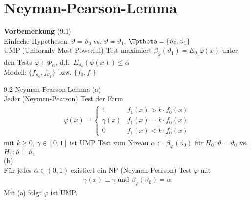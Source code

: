 \documentclass[a4paper,openany]{book}
\theoremstyle{mytheoremstyle}
\theoremstyle{mytheoremstyle2}
\begin{document}
\chapter{Neyman-Pearson-Lemma}
\noindent\textbf{Vorbemerkung} (9.1) \\
Einfache Hypothesen, $\vartheta =\vartheta _0$ vs. $\vartheta =\vartheta _1$, $\Uptheta=\{\vartheta _0,\vartheta _1\} $\\
UMP (Uniformly Most Powerful) Test maximiert $\beta _{\varphi }(\vartheta _1)=E _{\vartheta _1}\varphi (x)$ unter den Tests $\varphi \in \Phi _{\alpha }$, d.h. $E _{\vartheta _0}(\varphi (x))\leq \alpha $  \\
Modell: $\{f _{\vartheta _0},f _{\vartheta _1}\}$ bzw. $\{f_0,f_1\}$
\begin{theo}{9.2 Neyman-Pearson Lemma}{}
  (a) \\
  Jeder (Neyman-Pearson) Test der Form
  \begin{align*}
    \varphi (x)=\begin{cases}
      1 &f_1(x)>k \cdot f_0(x)\\
      \gamma (x)& f_1(x)=k \cdot f_0(x)\\
      0& f_1(x)<k \cdot f_0(x)
    \end{cases}
  \end{align*}
  mit $k \geq 0$, $\gamma \in [0,1]$ ist UMP Test zum Niveau $\alpha:=\beta _{\varphi }(\vartheta _0) $ für $H_0:\vartheta =\vartheta _0$ vs. $H_1:\vartheta = \vartheta _1$\\
  (b) \\
  Für jedes $\alpha \in (0,1)$ existiert ein NP (Neyman-Pearson) Test $\varphi $ mit
  \begin{align*}
    \gamma (x)\equiv \gamma \text{ und }\beta _{\varphi }(\vartheta _0)=\alpha 
  \end{align*}
  Mit (a) folgt $\varphi $ ist UMP.
\end{theo}
\end{document}
